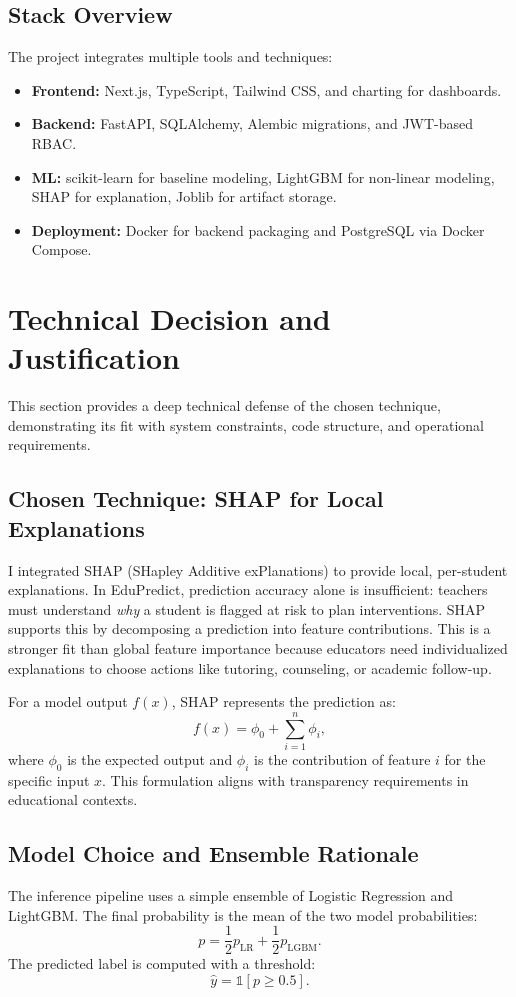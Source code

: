 \documentclass[12pt]{article}
\begin{document}
\subsection{Stack Overview}
The project integrates multiple tools and techniques:
\begin{itemize}
  \item \textbf{Frontend:} Next.js, TypeScript, Tailwind CSS, and charting for dashboards.
  \item \textbf{Backend:} FastAPI, SQLAlchemy, Alembic migrations, and JWT-based RBAC.
  \item \textbf{ML:} scikit-learn for baseline modeling, LightGBM for non-linear modeling, SHAP for explanation, Joblib for artifact storage.
  \item \textbf{Deployment:} Docker for backend packaging and PostgreSQL via Docker Compose.
\end{itemize}

\section{Technical Decision and Justification}
This section provides a deep technical defense of the chosen technique, demonstrating its fit with system constraints, code structure, and operational requirements.

\subsection{Chosen Technique: SHAP for Local Explanations}
I integrated SHAP (SHapley Additive exPlanations) to provide local, per-student explanations. In EduPredict, prediction accuracy alone is insufficient: teachers must understand \textit{why} a student is flagged at risk to plan interventions. SHAP supports this by decomposing a prediction into feature contributions. This is a stronger fit than global feature importance because educators need individualized explanations to choose actions like tutoring, counseling, or academic follow-up.

For a model output $f(x)$, SHAP represents the prediction as:
{\large
\begin{equation}
  f(x) = \phi_0 + \sum_{i=1}^{n} \phi_i,
\end{equation}
}
where $\phi_0$ is the expected output and $\phi_i$ is the contribution of feature $i$ for the specific input $x$. This formulation aligns with transparency requirements in educational contexts.

\subsection{Model Choice and Ensemble Rationale}
The inference pipeline uses a simple ensemble of Logistic Regression and LightGBM. The final probability is the mean of the two model probabilities:
{\large
\begin{equation}
  p = \frac{1}{2}p_{\text{LR}} + \frac{1}{2}p_{\text{LGBM}}.
\end{equation}
}
The predicted label is computed with a threshold:
{\large
\begin{equation}
  \hat{y} = \mathbb{1}[p \ge 0.5].
\end{equation}
}
\end{document}
